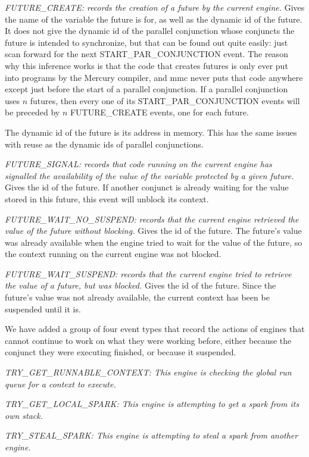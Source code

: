 \emph{FUTURE\_CREATE: records the creation of a future by the current engine.}
Gives the name of the variable the future is for,
as well as the dynamic id of the future.
It does not give the dynamic id of the parallel conjunction
whose conjuncts the future is intended to synchronize,
but that can be found out quite easily:
just scan forward for the next START\_PAR\_CONJUNCTION event.
The reason why this inference works is that
the code that creates futures
is only ever put into programs by the Mercury compiler,
and mmc never puts that code anywhere
except just before the start of a parallel conjunction.
If a parallel conjunction uses $n$ futures,
then every one of its START\_PAR\_CONJUNCTION events
will be preceded by $n$ FUTURE\_CREATE events,
one for each future.

The dynamic id of the future is its address in memory.
This has the same issues with reuse
as the dynamic ids of parallel conjunctions.

\emph{FUTURE\_SIGNAL: records that code running on the current engine
has signalled the availability
of the value of the variable protected by a given future.}
Gives the id of the future.
If another conjunct is already waiting for the value stored in this future,
this event will unblock its context.

\emph{FUTURE\_WAIT\_NO\_SUSPEND: records that the current engine
retrieved the value of the future without blocking.}
Gives the id of the future.
The future's value was already available
when the engine tried to wait for the value of the future,
so the context running on the current engine was not blocked.

\emph{FUTURE\_WAIT\_SUSPEND: records that the current engine
tried to retrieve the value of a future, but was blocked.}
Gives the id of the future.
Since the future's value was not already available,
the current context has been be suspended until it is.

We have added a group of four event types
that record the actions of engines
that cannot continue to work on what they were working before,
either because the conjunct they were executing finished,
or because it suspended.

\emph{TRY\_GET\_RUNNABLE\_CONTEXT: This engine is checking the global
run queue for a context to execute.}

\emph{TRY\_GET\_LOCAL\_SPARK: This engine is attempting to get a spark
from its own stack.}

\emph{TRY\_STEAL\_SPARK: This engine is attempting to steal a spark
from another engine.}

